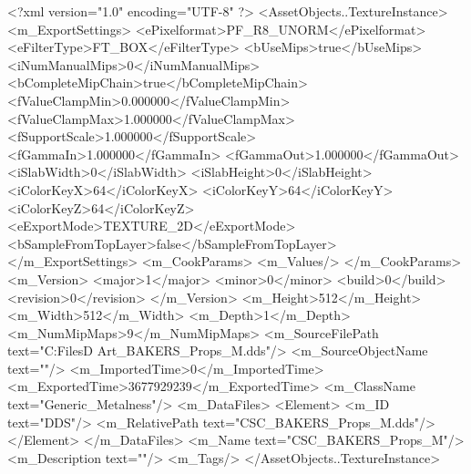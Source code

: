 <?xml version="1.0" encoding="UTF-8" ?>
<AssetObjects..TextureInstance>
	<m_ExportSettings>
		<ePixelformat>PF_R8_UNORM</ePixelformat>
		<eFilterType>FT_BOX</eFilterType>
		<bUseMips>true</bUseMips>
		<iNumManualMips>0</iNumManualMips>
		<bCompleteMipChain>true</bCompleteMipChain>
		<fValueClampMin>0.000000</fValueClampMin>
		<fValueClampMax>1.000000</fValueClampMax>
		<fSupportScale>1.000000</fSupportScale>
		<fGammaIn>1.000000</fGammaIn>
		<fGammaOut>1.000000</fGammaOut>
		<iSlabWidth>0</iSlabWidth>
		<iSlabHeight>0</iSlabHeight>
		<iColorKeyX>64</iColorKeyX>
		<iColorKeyY>64</iColorKeyY>
		<iColorKeyZ>64</iColorKeyZ>
		<eExportMode>TEXTURE_2D</eExportMode>
		<bSampleFromTopLayer>false</bSampleFromTopLayer>
	</m_ExportSettings>
	<m_CookParams>
		<m_Values/>
	</m_CookParams>
	<m_Version>
		<major>1</major>
		<minor>0</minor>
		<build>0</build>
		<revision>0</revision>
	</m_Version>
	<m_Height>512</m_Height>
	<m_Width>512</m_Width>
	<m_Depth>1</m_Depth>
	<m_NumMipMaps>9</m_NumMipMaps>
	<m_SourceFilePath text="C:\Users\Shadow\Desktop\Working Files\3D Art\Props\Bakers\CSC_BAKERS_Props_M.dds"/>
	<m_SourceObjectName text=""/>
	<m_ImportedTime>0</m_ImportedTime>
	<m_ExportedTime>3677929239</m_ExportedTime>
	<m_ClassName text="Generic_Metalness"/>
	<m_DataFiles>
		<Element>
			<m_ID text="DDS"/>
			<m_RelativePath text="CSC_BAKERS_Props_M.dds"/>
		</Element>
	</m_DataFiles>
	<m_Name text="CSC_BAKERS_Props_M"/>
	<m_Description text=""/>
	<m_Tags/>
</AssetObjects..TextureInstance>

